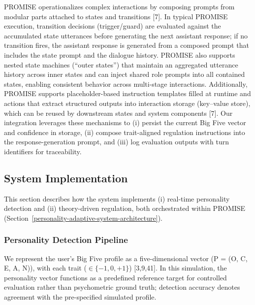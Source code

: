 PROMISE operationalizes complex interactions by composing prompts from modular parts attached to states and transitions {[}7{]}. In typical PROMISE execution, transition decisions (trigger/guard) are evaluated against the accumulated state utterances before generating the next assistant response; if no transition fires, the assistant response is generated from a composed prompt that includes the state prompt and the dialogue history. PROMISE also supports nested state machines (``outer states'') that maintain an aggregated utterance history across inner states and can inject shared role prompts into all contained states, enabling consistent behavior across multi-stage interactions. Additionally, PROMISE supports placeholder-based instruction templates filled at runtime and actions that extract structured outputs into interaction storage (key--value store), which can be reused by downstream states and system components {[}7{]}. Our integration leverages these mechanisms to (i) persist the current Big Five vector and confidence in storage, (ii) compose trait-aligned regulation instructions into the response-generation prompt, and (iii) log evaluation outputs with turn identifiers for traceability.

\subsection{System Implementation}\label{system-implementation}

This section describes how the system implements (i) real-time personality detection and (ii) theory-driven regulation, both orchestrated within PROMISE (Section~\ref{personality-adaptive-system-architecture}).

\subsubsection{Personality Detection Pipeline}\label{personality-detection-pipeline}

We represent the user's Big Five profile as a five-dimensional vector (P = (O, C, E, A, N)), with each trait ($\in \{-1, 0, +1\}$) {[}3,9,41{]}. In this simulation, the personality vector functions as a predefined reference target for controlled evaluation rather than psychometric ground truth; detection accuracy denotes agreement with the pre-specified simulated profile.

